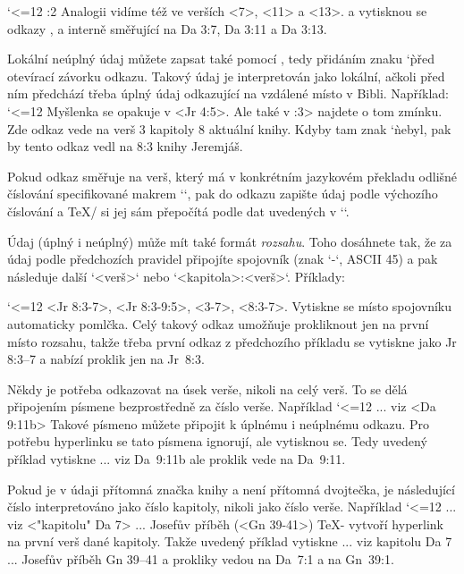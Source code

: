 \begtt \catcode`<=12
:2  {} Analogii vidíme též ve verších <7>, <11> a <13>.
\endtt
a vytisknou se odkazy {}, {} a {} interně směřující na 
Da 3:7, Da 3:11 a Da 3:13.

Lokální neúplný údaj můžete zapsat také pomocí , tedy
přidáním znaku `\` před otevírací závorku odkazu. Takový údaj je interpretován
jako lokální, ačkoli před ním předchází třeba úplný údaj odkazující na
vzdálené místo v Bibli. Například:
\begtt \catcode`<=12
 {} Myšlenka se opakuje v <Jr 4:5>. Ale také v :3> najdete o tom zmínku.
\endtt
Zde odkaz {} vede na verš 3 kapitoly 8 aktuální knihy. Kdyby tam
znak `\` nebyl, pak by tento odkaz vedl na 8:3 knihy Jeremjáš.

Pokud odkaz směřuje na verš, který má v konkrétním jazykovém překladu odlišné
číslování specifikované makrem `\renum`, pak do odkazu zapište údaj podle
výchozího číslování a \TeX/ si jej sám přepočítá podle dat uvedených v
`\renum`.

Údaj (úplný i neúplný) může mít také formát {\em rozsahu}. Toho dosáhnete
tak, že za údaj podle předchozích pravidel připojíte spojovník (znak `-`,
ASCII 45) a pak následuje další `<verš>` nebo `<kapitola>:<verš>`. Příklady:

\begtt \catcode`<=12
<Jr 8:3-7>,
<Jr 8:3-9:5>,
<3-7>,
<8:3-7>.
\endtt
Vytiskne se místo spojovníku automaticky pomlčka. 
Celý takový odkaz umožňuje prokliknout jen na první místo rozsahu, takže
třeba první odkaz z předchozího příkladu se vytiskne jako {\Blue Jr 8:3--7}
a nabízí proklik jen na Jr~8:3.

Někdy je potřeba odkazovat na úsek verše, nikoli na celý verš. To se dělá
připojením písmene bezprostředně za číslo verše. Například
\begtt \catcode`<=12
... viz <Da 9:11b>
\endtt
Takové písmeno můžete připojit k úplnému i neúplnému odkazu. Pro potřebu
hyperlinku se tato písmena ignorují, ale vytisknou se. Tedy uvedený příklad
vytiskne ... viz {\Blue Da~9:11b} ale proklik vede na Da~9:11.

Pokud je v údaji přítomná značka knihy a není přítomná dvojtečka, je
následující číslo interpretováno jako číslo kapitoly, nikoli jako číslo
verše. Například
\begtt \catcode`<=12
... viz <"kapitolu" Da 7>
... Josefův příběh (<Gn 39-41>)
\endtt
\TeX- vytvoří hyperlink na první verš dané kapitoly. Takže uvedený příklad
vytiskne ... viz {\Blue kapitolu Da 7} ... Josefův příběh {\Blue Gn 39--41}
a prokliky vedou na Da~7:1 a na Gn~39:1.

